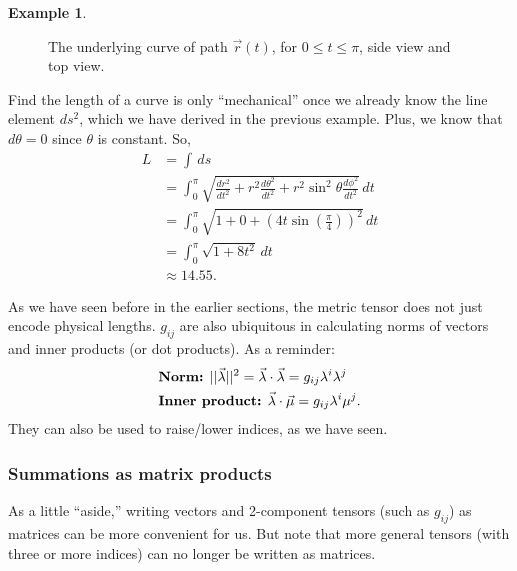 \documentclass{article}
\theoremstyle{definition}
\newtheorem{exmp}{Example}[section]
\begin{document}
\begin{exmp}
\begin{figure}[h!]
	\caption{The underlying curve of path $\vec{r}(t)$, for $0 \leq t \leq \pi$, side view and top view.}
\end{figure}
Find the length of a curve is only ``mechanical'' once we already know the line element $ds^2$, which we have derived in the previous example. Plus, we know that $d\theta = 0$ since $\theta$ is constant. So,
\begin{align*}
L &= \int\,ds\\ 
&= \int_{0}^{\pi}\sqrt{\frac{dr^2}{dt^2} + r^2\frac{d\theta^2}{dt^2} + r^2\sin^2\theta\frac{d\phi^2}{dt^2}}\,dt\\
&= \int_{0}^{\pi}\sqrt{1 + 0 + \left( 4t\sin\left(\frac{\pi}{4} \right) \right) ^2}\,dt\\
&= \int_{0}^{\pi}\sqrt{1 + 8t^2}\,dt\\
&\approx 14.55. 
\end{align*}
\end{exmp}
As we have seen before in the earlier sections, the metric tensor does not just encode physical lengths. $g_{ij}$ are also ubiquitous in calculating norms of vectors and inner products (or dot products). As a reminder:
\begin{align*}
&\text{\textbf{Norm:} } \vert\vert \vec{\lambda} \vert\vert^2 = \vec{\lambda}\cdot\vec{\lambda} = g_{ij}\lambda^i\lambda^j\\
&\text{\textbf{Inner product:} } \vec{\lambda}\cdot\vec{\mu} = g_{ij}\lambda^i\mu^j.
\end{align*}
They can also be used to raise/lower indices, as we have seen. 
\subsubsection{Summations as matrix products}
As a little ``aside,'' writing vectors and 2-component tensors (such as $g_{ij}$) as matrices can be more convenient for us. But note that more general tensors (with three or more indices) can no longer be written as matrices.\\
\end{document}
